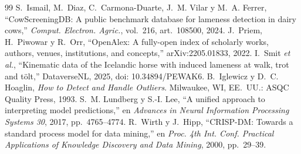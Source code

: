 \documentclass[conference,a4paper]{IEEEtran}
\begin{document}
\begin{thebibliography}{99}
 S.~Ismail, M.~Diaz, C.~Carmona-Duarte, J.~M. Vilar y M.~A. Ferrer, ``CowScreeningDB: A public benchmark database for lameness detection in dairy cows,'' \emph{Comput. Electron. Agric.}, vol.~216, art.~108500, 2024.
 J.~Priem, H.~Piwowar y R.~Orr, ``OpenAlex: A fully-open index of scholarly works, authors, venues, institutions, and concepts,'' arXiv:2205.01833, 2022.
 I.~Smit \emph{et al.}, ``Kinematic data of the Icelandic horse with induced lameness at walk, trot and tölt,'' DataverseNL, 2025, doi: 10.34894/PEWAK6.
 B.~Iglewicz y D.~C. Hoaglin, \emph{How to Detect and Handle Outliers}. Milwaukee, WI, EE.~UU.: ASQC Quality Press, 1993.
 S.~M. Lundberg y S.-I. Lee, ``A unified approach to interpreting model predictions,'' en \emph{Advances in Neural Information Processing Systems 30}, 2017, pp.~4765--4774.
 R.~Wirth y J.~Hipp, ``CRISP-DM: Towards a standard process model for data mining,'' en \emph{Proc. 4th Int. Conf. Practical Applications of Knowledge Discovery and Data Mining}, 2000, pp.~29--39.
\end{thebibliography}
\end{document}
